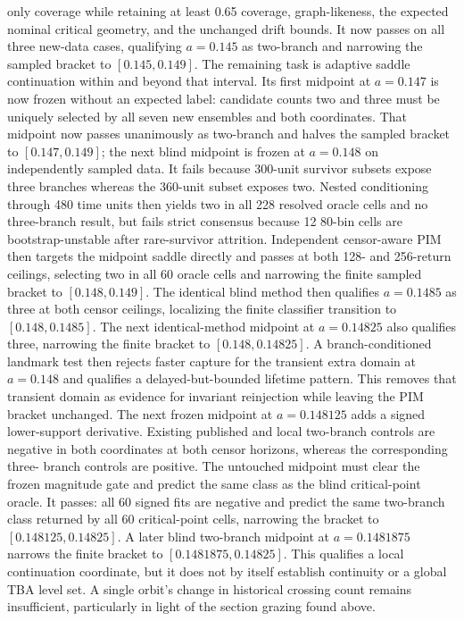 only coverage while retaining at least 0.65 coverage, graph-likeness, the
expected nominal critical geometry, and the unchanged drift bounds.  It now
passes on all three new-data cases, qualifying $a=0.145$ as two-branch and
narrowing the sampled bracket to $[0.145,0.149]$.  The remaining task is
adaptive saddle continuation within and beyond that interval.  Its first
midpoint at $a=0.147$ is now frozen without an expected label: candidate counts
two and three must be uniquely selected by all seven new ensembles and both
coordinates.  That midpoint now passes unanimously as two-branch and halves
the sampled bracket to $[0.147,0.149]$; the next blind midpoint is frozen at
$a=0.148$ on independently sampled data.  It fails because 300-unit survivor
subsets expose three branches whereas the 360-unit subset exposes two.  Nested
conditioning through 480 time units then yields two in all 228 resolved oracle
cells and no three-branch result, but fails strict consensus because 12 80-bin
cells are bootstrap-unstable after rare-survivor attrition.  Independent
censor-aware PIM then targets the midpoint saddle directly and passes at both
128- and 256-return ceilings, selecting two in all 60 oracle cells and narrowing
the finite sampled bracket to $[0.148,0.149]$.  The identical blind method then
qualifies $a=0.1485$ as three at both censor ceilings, localizing the finite
classifier transition to $[0.148,0.1485]$.  The next identical-method midpoint
at $a=0.14825$ also qualifies three, narrowing the finite bracket to
$[0.148,0.14825]$.  A branch-conditioned landmark test
then rejects faster capture for the transient extra domain at $a=0.148$ and
qualifies a delayed-but-bounded lifetime pattern.  This removes that transient
domain as evidence for invariant reinjection while leaving the PIM bracket
unchanged.  The next frozen midpoint at $a=0.148125$ adds a signed lower-support
derivative.  Existing published and local two-branch controls are negative in
both coordinates at both censor horizons, whereas the corresponding three-
branch controls are positive.  The untouched midpoint must clear the frozen
magnitude gate and predict the same class as the blind critical-point oracle.
It passes: all 60 signed fits are negative and predict the same two-branch
class returned by all 60 critical-point cells, narrowing the bracket to
$[0.148125,0.14825]$.  A later blind two-branch midpoint at $a=0.1481875$
narrows the finite bracket to $[0.1481875,0.14825]$.  This qualifies a local
continuation coordinate, but it
does not by itself establish continuity or a global TBA level set.  A single
orbit's change in
historical crossing count remains insufficient,
particularly in light of the section grazing found above.

